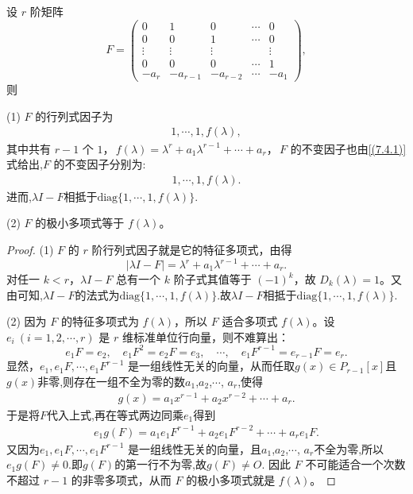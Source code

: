\documentclass[../../main.tex]{subfiles}
\begin{document}
\begin{lemma}\label{lemma:Frobenius标准型矩阵的极小多项式和不变因子}
设 $r$ 阶矩阵
\[
F = \begin{pmatrix}
0 & 1 & 0 & \cdots & 0 \\
0 & 0 & 1 & \cdots & 0 \\
\vdots & \vdots & \vdots & & \vdots \\
0 & 0 & 0 & \cdots & 1 \\
-a_r & -a_{r - 1} & -a_{r - 2} & \cdots & -a_1
\end{pmatrix},
\]
则

(1) $F$ 的行列式因子为
\begin{align}
1,\cdots,1,f(\lambda),\label{(7.4.1)}
\end{align}
其中共有 $r - 1$ 个 $1$，$\,f(\lambda)=\lambda^r + a_1\lambda^{r - 1}+\cdots + a_r$，$\,F$ 的不变因子也由\eqref{(7.4.1)}式给出,$F$ 的不变因子分别为:
\begin{align*}
1,\cdots,1,f(\lambda).
\end{align*}
进而,$\lambda I-F$相抵于$\mathrm{diag}\{1,\cdots,1,f(\lambda)\}.$

(2) $F$ 的极小多项式等于 $f(\lambda)$。
\end{lemma}
\begin{proof}
(1) $F$ 的 $r$ 阶行列式因子就是它的特征多项式，由得
\[
|\lambda I - F| = \lambda^r + a_1\lambda^{r - 1}+\cdots + a_r.
\]
对任一 $k < r$，$\lambda I - F$ 总有一个 $k$ 阶子式其值等于 $(-1)^k$，故 $D_k(\lambda)=1$。又由可知,$\lambda I-F$的法式为$\mathrm{diag}\{1,\cdots,1,f(\lambda)\}.$故$\lambda I-F$相抵于$\mathrm{diag}\{1,\cdots,1,f(\lambda)\}.$

(2) 因为 $F$ 的特征多项式为 $f(\lambda)$，所以 $F$ 适合多项式 $f(\lambda)$。设 $e_i\ (i = 1, 2, \cdots, r)$ 是 $r$ 维标准单位行向量，则不难算出：
\[
e_1F = e_2,\quad e_1F^2 =e_2F= e_3,\quad \cdots,\quad e_1F^{r - 1} =e_{r-1}F= e_r.
\]
显然，$e_1, e_1F,\cdots, e_1F^{r - 1}$ 是一组线性无关的向量，从而任取$g(x)\in P_{r-1}[x]$且$g(x)$非零,则存在一组不全为零的数$a_1$,$a_2$,$\cdots$, $a_r$,使得
\begin{align*}
g(x)=a_1x^{r-1}+a_2x^{r-2}+\cdots+a_r.
\end{align*}
于是将$F$代入上式,再在等式两边同乘$e_1$得到
\begin{align*}
e_1g(F)=a_1e_1F^{r-1}+a_2e_1F^{r-2}+\cdots +a_re_1F.
\end{align*}
又因为$e_1, e_1F,\cdots, e_1F^{r - 1}$ 是一组线性无关的向量，且$a_1$,$a_2$,$\cdots$, $a_r$不全为零,所以$e_1g(F)\ne 0.$即$g(F)$的第一行不为零,故$g(F)\ne O$.
因此 $F$ 不可能适合一个次数不超过 $r - 1$ 的非零多项式，从而 $F$ 的极小多项式就是 $f(\lambda)$。
\end{proof}
\end{document}
